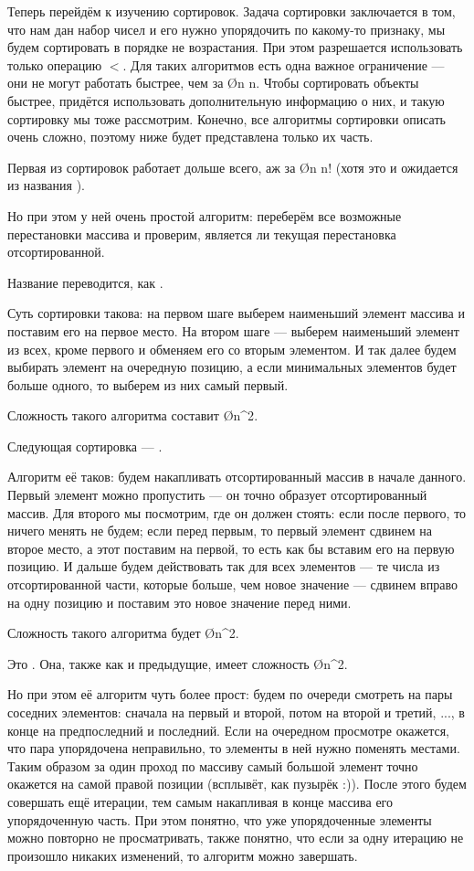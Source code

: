 Теперь перейдём к изучению сортировок. Задача сортировки заключается в том, что нам дан набор чисел и его нужно упорядочить по какому-то признаку, мы будем сортировать в порядке не возрастания. При этом разрешается использовать только операцию $<$. Для таких алгоритмов есть одна важное ограничение — они не могут работать быстрее, чем за \O{n \log n}. Чтобы сортировать объекты быстрее, придётся использовать дополнительную информацию о них, и такую сортировку мы тоже рассмотрим. Конечно, все алгоритмы сортировки описать очень сложно, поэтому ниже будет представлена только их часть.

Первая из сортировок работает дольше всего, аж за \O{n \cdot n!} (хотя это и ожидается из названия ).

Но при этом у ней очень простой алгоритм: переберём все возможные перестановки массива и проверим, является ли текущая перестановка отсортированной. 

Название переводится, как .

Суть сортировки такова: на первом шаге выберем наименьший элемент массива и поставим его на первое место. На втором шаге — выберем наименьший элемент из всех, кроме первого и обменяем его со вторым элементом. И так далее будем выбирать элемент на очередную позицию, а если минимальных элементов будет больше одного, то выберем из них самый первый.

Сложность такого алгоритма составит \O{n^2}.

Следующая сортировка — .

Алгоритм её таков: будем накапливать отсортированный массив в начале данного. Первый элемент можно пропустить — он точно образует отсортированный массив. Для второго мы посмотрим, где он должен стоять: если после первого, то ничего менять не будем; если перед первым, то первый элемент сдвинем на второе место, а этот поставим на первой, то есть как бы вставим его на первую позицию. И дальше будем действовать так для всех элементов — те числа из отсортированной части, которые больше, чем новое значение — сдвинем вправо на одну позицию и поставим это новое значение перед ними.

Сложность такого алгоритма будет \O{n^2}.

Это . Она, также как и предыдущие, имеет сложность \O{n^2}.

Но при этом её алгоритм чуть более прост: будем по очереди смотреть на пары соседних элементов: сначала на первый и второй, потом на второй и третий, ..., в конце на предпоследний и последний. Если на очередном просмотре окажется, что пара упорядочена неправильно, то элементы в ней нужно поменять местами. Таким образом за один проход по массиву самый большой элемент точно окажется на самой правой позиции (всплывёт, как пузырёк :)). После этого будем совершать ещё итерации, тем самым накапливая в конце массива его упорядоченную часть. При этом понятно, что уже упорядоченные элементы можно повторно не просматривать, также понятно, что если за одну итерацию не произошло никаких изменений, то алгоритм можно завершать.

